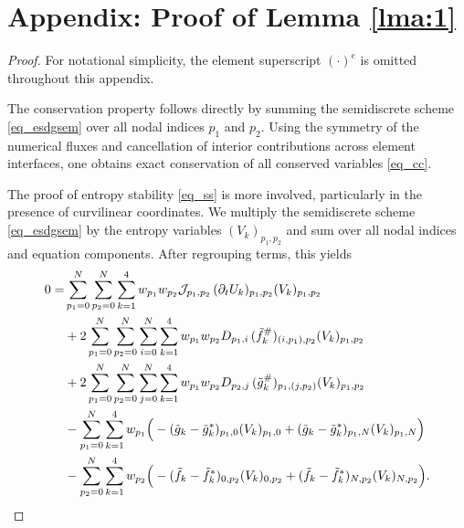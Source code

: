 \documentclass[fleqn,11pt]{amsart}
\begin{document}
{\section*{Appendix: Proof of Lemma \ref{lma:1}}
\begin{proof}
    For notational simplicity, the element superscript $(\cdot)^e$ is omitted
throughout this appendix.

The conservation property follows directly by summing the semidiscrete scheme
\eqref{eq_esdgsem} over all nodal indices $p_1$ and $p_2$.
Using the symmetry of the numerical fluxes and cancellation of interior
contributions across element interfaces, one obtains exact conservation of all
conserved variables \eqref{eq_cc}.

The proof of entropy stability \eqref{eq_ss} is more involved, particularly in the presence of
curvilinear coordinates.
We multiply the semidiscrete scheme \eqref{eq_esdgsem} by the entropy variables
$(V_k)_{p_1,p_2}$ and sum over all nodal indices and equation components.
After regrouping terms, this yields
\begin{equation}
\label{ecec}
    \begin{aligned}
0=&\sum_{p_1=0}^N\sum_{p_2=0}^N\sum_{k=1}^4 w_{p_1}w_{p_2}\mathcal{J}_{p_1,p_2}\,(\partial_tU_k)_{p_1,p_2}(V_k)_{p_1,p_2}\\
&+
2\sum_{p_1=0}^N\sum_{p_2=0}^N\sum_{i=0}^N\sum_{k=1}^4w_{p_1}w_{p_2} D_{p_1,i}\,(\tilde{f}_k^{\#})_{(i,p_1),p_2}(V_k)_{p_1,p_2}\\
&+
2\sum_{p_1=0}^N\sum_{p_2=0}^N\sum_{j=0}^N\sum_{k=1}^4w_{p_1}w_{p_2} D_{p_2,j}\,(\tilde{g}_k^{\#})_{p_1,(j,p_2)}(V_k)_{p_1,p_2}\\
&-\sum_{p_1=0}^N\sum_{k=1}^4 w_{p_1}\Big(
-(\Tilde{g}_k-\Tilde{g}_k^*)_{p_1,0}(V_k)_{p_1,0}
+(\Tilde{g}_k-\Tilde{g}_k^*)_{p_1,N}(V_k)_{p_1,N}\Big)\\
&
-\sum_{p_2=0}^N\sum_{k=1}^4
w_{p_2}\Big(
-(\Tilde{f}_k-\Tilde{f}_k^*)_{0,p_2}(V_k)_{0,p_2}
+(\Tilde{f}_k-\Tilde{f}_k^*)_{N,p_2}(V_k)_{N,p_2}\Big).
\end{aligned}
\end{equation}


\end{proof}}
\end{document}
